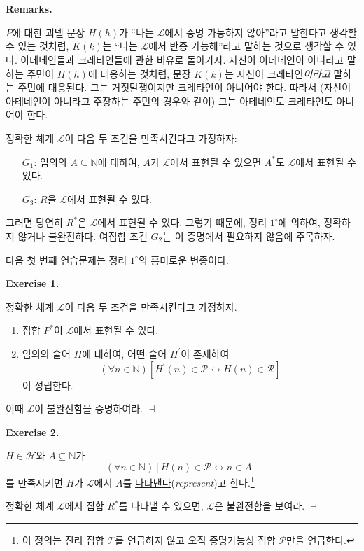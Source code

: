 \documentclass[12pt]{paper}
\newenvironment{context}[1][]
{ \noindent \textbf{{#1}.}
}
{ \hfill $ \dashv $
}
\begin{document}
\begin{context}[Remarks]
$\tilde{P}$에 대한 괴델 문장 $H \left( h \right)$가 ``나는 $\mathcal{L}$에서 증명 가능하지 않아''라고 말한다고 생각할 수 있는 것처럼,
$K \left( k \right)$는 ``나는 $\mathcal{L}$에서 반증 가능해''라고 말하는 것으로 생각할 수 있다.
아테네인들과 크레타인들에 관한 비유로 돌아가자.
자신이 아테네인이 아니라고 말하는 주민이 $H \left( h \right)$에 대응하는 것처럼,
문장 $K \left( k \right)$는 자신이 크레타인\textit{이라고} 말하는 주민에 대응된다.
그는 거짓말쟁이지만 크레타인이 아니어야 한다.
따라서 (자신이 아테네인이 아니라고 주장하는 주민의 경우와 같이) 그는 아테네인도 크레타인도 아니어야 한다.

정확한 체계 $\mathcal{L}$이 다음 두 조건을 만족시킨다고 가정하자:
\begin{itemize}
\item[$G_{1}$:] 임의의 $A \subseteq \mathbb{N}$에 대하여, $A$가 $\mathcal{L}$에서 표현될 수 있으면 $A^{*}$도 $\mathcal{L}$에서 표현될 수 있다.
\item[$G_{3}^{\prime}$:] $R$을 $\mathcal{L}$에서 표현될 수 있다.
\end{itemize}

그러면 당연히 $R^{*}$은 $\mathcal{L}$에서 표현될 수 있다.
그렇기 때문에, 정리 $1^{\circ}$에 의하여, 정확하지 않거나 불완전하다.
여집합 조건 $G_{2}$는 이 증명에서 필요하지 않음에 주목하자.
\end{context}

다음 첫 번째 연습문제는 정리 $1^{\circ}$의 흥미로운 변종이다.

\begin{context}[Exercise 1]
정확한 체계 $\mathcal{L}$이 다음 두 조건을 만족시킨다고 가정하자.
\begin{enumerate}
\item 집합 $P^{*}$이 $\mathcal{L}$에서 표현될 수 있다.
\item 임의의 술어 $H$에 대하여, 어떤 술어 $H^{\prime}$이 존재하여 $$\left( \forall n \in \mathbb{N} \right) \left[ H^{\prime} \left( n \right) \in \mathcal{P} \leftrightarrow H \left( n \right) \in \mathcal{R} \right]$$이 성립한다.
\end{enumerate}

이때 $\mathcal{L}$이 불완전함을 증명하여라.
\end{context}

\begin{context}[Exercise 2]
$H \in \mathcal{H}$와 $A \subseteq \mathbb{N}$가
$$ \left( \forall n \in \mathbb{N} \right) \left[ H \left( n \right) \in \mathcal{P} \leftrightarrow n \in A \right] $$를 만족시키면
$H$가 $\mathcal{L}$에서 $A$를 \underline{나타낸다}(\textit{represent})고 한다.\footnote
{
이 정의는 진리 집합 $\mathcal{T}$를 언급하지 않고 오직 증명가능성 집합 $\mathcal{P}$만을 언급한다.
}

정확한 체계 $\mathcal{L}$에서 집합 $R^{*}$를 나타낼 수 있으면, $\mathcal{L}$은 불완전함을 보여라.
\end{context}
\end{document}
